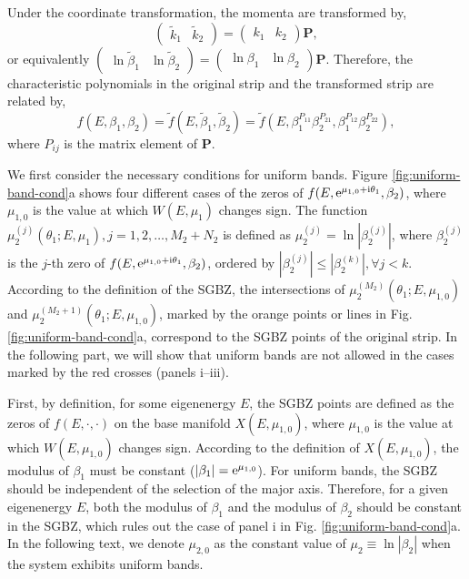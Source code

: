 Under the coordinate transformation, the momenta are transformed by,
\begin{equation}
\begin{pmatrix}\tilde{k}_{1} & \tilde{k}_{2}\end{pmatrix}=\begin{pmatrix}k_{1} & k_{2}\end{pmatrix}\mathbf{P},\label{eq:transformation-k}
\end{equation}
or equivalently $\begin{pmatrix}\ln\tilde{\beta}_{1} & \ln\tilde{\beta}_{2}\end{pmatrix}=\begin{pmatrix}\ln\beta_{1} & \ln\beta_{2}\end{pmatrix}\mathbf{P}$.
Therefore, the characteristic polynomials in the original strip and
the transformed strip are related by, 
\begin{equation}
f\left(E,\beta_{1},\beta_{2}\right)=\tilde{f}\left(E,\tilde{\beta}_{1},\tilde{\beta}_{2}\right)=\tilde{f}\left(E,\beta_{1}^{P_{11}}\beta_{2}^{P_{21}},\beta_{1}^{P_{12}}\beta_{2}^{P_{22}}\right),\label{eq:ChP-relations}
\end{equation}
where $P_{ij}$ is the matrix element of $\mathbf{P}$.

We first consider the necessary conditions for uniform bands. Figure
\ref{fig:uniform-band-cond}a shows four different cases of the zeros
of $f(E,\mathrm{e}^{\mu_{1,0}+\mathrm{i}\theta_{1}},\beta_{2})$, where $\mu_{1,0}$
is the value at which $W(E,\mu_{1})$ changes sign. The function $\mu_{2}^{(j)}(\theta_{1};E,\mu_{1}),j=1,2,\dots,M_{2}+N_{2}$
is defined as $\mu_{2}^{(j)}=\ln|\beta_{2}^{(j)}|$, where $\beta_{2}^{(j)}$
is the $j$-th zero of $f(E,\mathrm{e}^{\mu_{1,0}+\mathrm{i}\theta_{1}},\beta_{2})$,
ordered by $|\beta_{2}^{(j)}|\leq|\beta_{2}^{(k)}|,\forall j<k$.
According to the definition of the SGBZ, the intersections of $\mu_{2}^{(M_{2})}(\theta_{1};E,\mu_{1,0})$
and $\mu_{2}^{(M_{2}+1)}(\theta_{1};E,\mu_{1,0})$, marked by the
orange points or lines in Fig. \ref{fig:uniform-band-cond}a, correspond
to the SGBZ points of the original strip. In the following part, we
will show that uniform bands are not allowed in the cases marked by
the red crosses (panels i--iii).

First, by definition, for some eigenenergy $E$, the SGBZ points are
defined as the zeros of $f(E,\cdot,\cdot)$ on the base manifold $X(E,\mu_{1,0})$,
where $\mu_{1,0}$ is the value at which $W(E,\mu_{1,0})$ changes
sign. According to the definition of $X(E,\mu_{1,0})$, the modulus
of $\beta_{1}$ must be constant ($|\beta_{1}|=\mathrm{e}^{\mu_{1,0}}$).
For uniform bands, the SGBZ should be independent of the selection
of the major axis. Therefore, for a given eigenenergy $E$, both the
modulus of $\beta_{1}$ and the modulus of $\beta_{2}$ should be
constant in the SGBZ, which rules out the case of panel i in Fig.
\ref{fig:uniform-band-cond}a. In the following text, we denote $\mu_{2,0}$
as the constant value of $\mu_{2}\equiv\ln|\beta_{2}|$ when the system
exhibits uniform bands.

